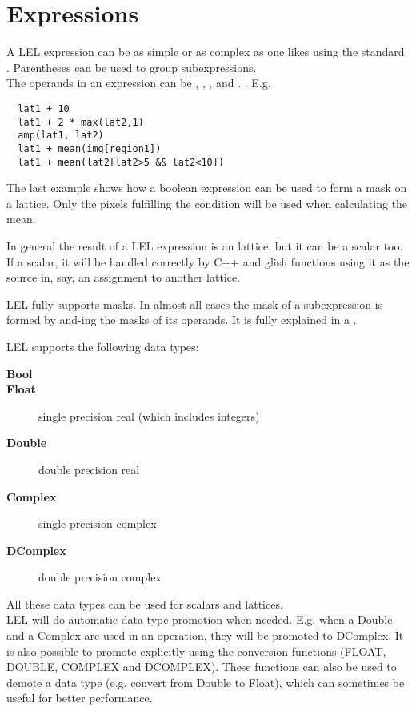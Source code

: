 \section{\label{LEL:EXPRESSIONS}Expressions}
A LEL expression can be as simple or as complex as one likes
using the standard
.
Parentheses can be used to group subexpressions.
\\The operands in an expression can be
,
,
, and
.
.
E.g.
\begin{verbatim}
  lat1 + 10
  lat1 + 2 * max(lat2,1)
  amp(lat1, lat2)
  lat1 + mean(img[region1])
  lat1 + mean(lat2[lat2>5 && lat2<10])
\end{verbatim}
The last example shows how a boolean expression can be used to form
a mask on a lattice. Only the pixels fulfilling the condition will be
used when calculating the mean.

In general the result of a LEL expression is an lattice, but it
can be a scalar too. If a scalar, it will be handled correctly
by C++ and glish functions using it as the source in, say, an
assignment to another lattice.

LEL fully supports masks. In almost all cases the mask of a
subexpression is formed by and-ing the masks of its operands.
It is fully explained in a .


\label{LEL:DATATYPES}
LEL supports the following data types:
\begin{description}
  \item[ \textbf{Bool}]
  \item[ \textbf{Float}] single precision real (which includes integers)
  \item[ \textbf{Double}] double precision real
  \item[ \textbf{Complex} ] single precision complex
  \item[ \textbf{DComplex} ] double precision complex
\end{description}
All these data types can be used for scalars and lattices.
\\LEL will do automatic data type promotion when needed. E.g. when
a Double and a Complex are used in an operation, they will be promoted
to DComplex. It is also possible to promote explicitly using the
conversion functions (FLOAT, DOUBLE, COMPLEX and DCOMPLEX).
These functions can also be used to demote a data type
(e.g. convert from Double to Float), which can sometimes
be useful for better performance.

